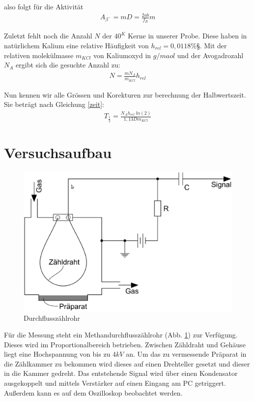 \documentclass[12pt]{article}
\begin{document}
also folgt für die Aktivität
\begin{align}
 A_{\beta^-}=m D=\frac{2ab}{f_B}m
\end{align}

Zuletzt fehlt noch die Anzahl $N$ der ${40}^K$ Kerne in unserer Probe. Diese haben in natürlichem Kalium eine relative Häufigkeit von $h_{rel}=0,0118\%$§. Mit der relativen molekülmasse $m_{KCl}$ von Kaliumoxyd in $g/maol$ und der Avogadrozahl $N_A$ ergibt sich die gesuchte Anzahl zu:
\begin{align}
 N=\frac{m N_A}{m_{KCl}} h_{rel}
\end{align}

Nun kennen wir alle Grössen und Korekturen zur berechnung der Halbwertszeit. Sie beträgt nach Gleichung \ref{zeit}:
\begin{align}
 T_{\frac{1}{2}} = \frac{N_A h_{rel} ~ ln(2)}{1,13 D m_{KCl}}
\end{align}
\newpage

\section{Versuchsaufbau}

\begin{figure}[H]  
\centering
\includegraphics[width=0.9\linewidth]{pictures/aufbau.eps}
\caption{Durchflusszählrohr}
\label{aufbau}
\end{figure}

Für die Messung steht ein Methandurchflusszählrohr (Abb. \ref{aufbau}) zur Verfügung.
Dieses wird im Proportionalbereich betrieben. Zwischen Zähldraht und Gehäuse liegt eine Hochspannung von bis zu 4$kV$ an.
Um das zu vermessende Präparat in die Zählkammer zu bekommen wird dieses auf einen Drehteller gesetzt und dieser in die Kammer gedreht.
Das entstehende Signal wird über einen Kondensator ausgekoppelt und mittels Verstärker auf einen Eingang am PC getriggert. Außerdem kann
es auf dem Oszilloskop beobachtet werden.
\end{document}
